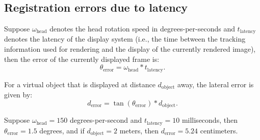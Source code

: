 \chapter[]{}
\section[]{Registration errors due to latency}
\label{sec:appendix:registration_errors_latency}

Suppose $\omega_{\text{head}}$ denotes the head rotation speed in degrees-per-seconds and $t_{\text{latency}}$ denotes the latency of the display system (i.e., the time between the tracking information used for rendering and the display of the currently rendered image), then the error of the currently displayed frame is:
\begin{equation}
    \theta_{\text{error}} = \omega_{\text{head}} \ast t_{\text{latency}}.
\end{equation}

For a virtual object that is displayed at distance $d_{\text{object}}$ away, the lateral error is given by:
\begin{equation}
    d_{\text{error}} = \tan(\theta_{\text{error}}) \ast d_{\text{object}}.
\end{equation}

Suppose $\omega_{\text{head}} = 150$ degrees-per-second and $t_{\text{latency}} = 10$ milliseconds, then $\theta_{\text{error}}=1.5$ degrees, and if $d_{\text{object}}=2$ meters, then $d_{\text{error}}=5.24$ centimeters.